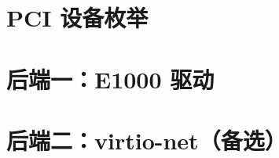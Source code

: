 
\section{PCI 设备枚举}
\label{sec:nic-pci}


\section{后端一：E1000 驱动}
\label{sec:nic-e1000}


\section{后端二：virtio-net（备选）}
\label{sec:nic-virtio}

